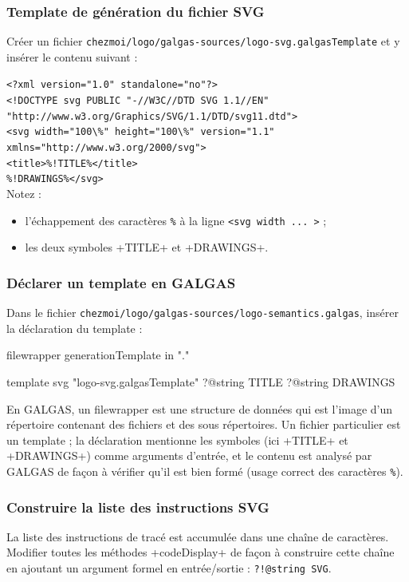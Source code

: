 \subsubsection{Template de génération du fichier SVG}
Créer un fichier \texttt{chezmoi/logo/galgas-sources/logo-svg.galgasTemplate} et y insérer le contenu suivant :

\texttt{<?xml version="1.0" standalone="no"?>}\\
\texttt{<!DOCTYPE svg PUBLIC "-//W3C//DTD SVG 1.1//EN"}\\
\texttt{\hspace*{5cm}"http://www.w3.org/Graphics/SVG/1.1/DTD/svg11.dtd">}\\
\texttt{<svg width="100\textbackslash\%" height="100\textbackslash\%" version="1.1" xmlns="http://www.w3.org/2000/svg">}\\
\texttt{<title>\%!TITLE\%</title>}\\
\texttt{\%!DRAWINGS\%</svg>}\\

Notez :
\begin{itemize}
  \item l'échappement des caractères \texttt{\%} à la ligne \texttt{<svg width ... >} ;
  \item les deux symboles \ggs+TITLE+ et \ggs+DRAWINGS+.
\end{itemize}

\subsubsection{Déclarer un template en GALGAS}
Dans le fichier \texttt{chezmoi/logo/galgas-sources/logo-semantics.galgas}, insérer la déclaration du template :
\begin{galgas}
filewrapper generationTemplate in "." {
} {
} {

template svg "logo-svg.galgasTemplate"
  ?@string TITLE
  ?@string DRAWINGS
}
\end{galgas}

En GALGAS, un filewrapper est une structure de données qui est l'image d'un répertoire contenant des fichiers et des sous répertoires. Un fichier particulier est un template ; la déclaration mentionne les symboles (ici \ggs+TITLE+ et \ggs+DRAWINGS+) comme arguments d'entrée, et le contenu est analysé par GALGAS de façon à vérifier qu'il est bien formé (usage correct des caractères \texttt{\%}).

\subsubsection{Construire la liste des instructions SVG}
La liste des instructions de tracé est accumulée dans une chaîne de caractères. Modifier toutes les méthodes \ggs+codeDisplay+ de façon à construire cette chaîne en ajoutant un argument formel en entrée/sortie : \texttt{?!@string SVG}.

